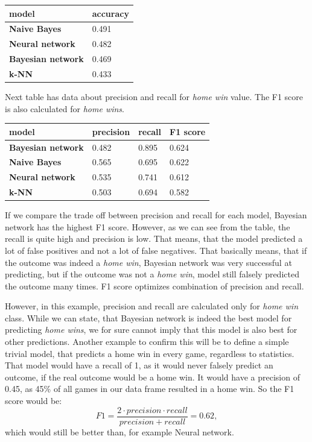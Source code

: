 \documentclass[conference]{IEEEtran}
\begin{document}
\begin{table}[!ht]
    \centering
    \begin{tabular}{ll}
        model & accuracy \\ \hline
        \textbf{Naive Bayes} & 0.491 \\ 
        \textbf{Neural network} & 0.482 \\ 
        \textbf{Bayesian network} & 0.469 \\ 
        \textbf{k-NN} & 0.433 \\ 
    \end{tabular}
\end{table}

Next table has data about precision and recall for \textit{home win} value. The F1 score is also
calculated for \textit{home wins}.

\begin{table}[!ht]
    \centering
    \begin{tabular}{llll}
        model & precision & recall & F1 score \\ \hline
        \textbf{Bayesian network} & 0.482 & 0.895 & 0.624 \\ 
        \textbf{Naive Bayes} & 0.565 & 0.695 & 0.622 \\ 
        \textbf{Neural network} & 0.535 & 0.741 & 0.612 \\ 
        \textbf{k-NN} & 0.503 & 0.694 & 0.582 \\ 
    \end{tabular}
\end{table}


If we compare the trade off between precision and recall for each model, Bayesian network
has the highest F1 score. However, as we can see from the table, the recall is quite high and
precision is low. That means, that the model predicted a lot of false positives and not a lot 
of false negatives. That basically means, that if the outcome was indeed a \textit{home win},
Bayesian network was very successful at predicting, but if the outcome was not a \textit{home
win}, model still falsely predicted the outcome many times. F1 score optimizes combination 
of precision and recall. 

However, in this example, precision and recall are calculated only for \textit{home win}
class. While we can state, that Bayesian network is indeed the best model for predicting 
\textit{home wins}, we for sure cannot imply that this model is also best for other predictions.
Another example to confirm this will be to define a simple trivial model, that predicts a 
home win in every game, regardless to statistics. That model would have a recall of 1, as it
would never falsely predict an outcome, if the real outcome would be a home win. It would have
a precision of 0.45, as 45\% of all games in our data frame resulted in a home win. So the F1
score would be: $$F1 = \frac{2 \cdot precision \cdot recall}{precision + recall} = 0.62,$$
which would still be better than, for example Neural network. 
\end{document}
